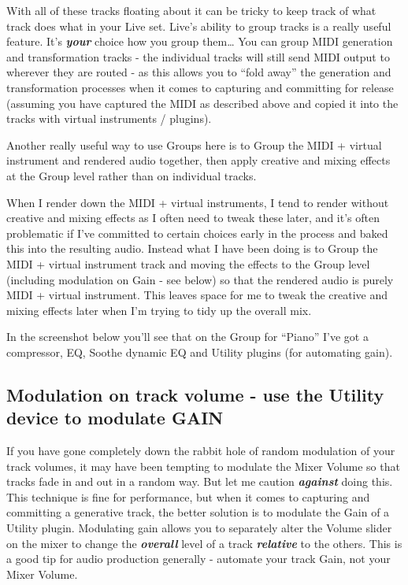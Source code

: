 \documentclass[
  12pt,
  letterpaper,
  oneside,
  open=any]{scrbook}
\makeatletter
\newcommand*\pandocbounded[1]{%
  \sbox\pandoc@box{#1}%
  \Gscale@div\@tempa{\textheight}{\dimexpr\ht\pandoc@box+\dp\pandoc@box\relax}%
  \Gscale@div\@tempb{\linewidth}{\wd\pandoc@box}%
  \ifdim\@tempb\p@<\@tempa\p@\let\@tempa\@tempb\fi%
  \ifdim\@tempa\p@<\p@\scalebox{\@tempa}{\usebox\pandoc@box}%
  \else\usebox{\pandoc@box}%
  \fi%
}
\makeatother
\begin{document}
With all of these tracks floating about it can be tricky to keep track
of what track does what in your Live set. Live's ability to group tracks
is a really useful feature. It's \textbf{\emph{your}} choice how you
group them\ldots{} You can group MIDI generation and transformation
tracks - the individual tracks will still send MIDI output to wherever
they are routed - as this allows you to ``fold away'' the generation and
transformation processes when it comes to capturing and committing for
release (assuming you have captured the MIDI as described above and
copied it into the tracks with virtual instruments / plugins).

Another really useful way to use Groups here is to Group the MIDI +
virtual instrument and rendered audio together, then apply creative and
mixing effects at the Group level rather than on individual tracks.

When I render down the MIDI + virtual instruments, I tend to render
without creative and mixing effects as I often need to tweak these
later, and it's often problematic if I've committed to certain choices
early in the process and baked this into the resulting audio. Instead
what I have been doing is to Group the MIDI + virtual instrument track
and moving the effects to the Group level (including modulation on Gain
- see below) so that the rendered audio is purely MIDI + virtual
instrument. This leaves space for me to tweak the creative and mixing
effects later when I'm trying to tidy up the overall mix.

In the screenshot below you'll see that on the Group for ``Piano'' I've
got a compressor, EQ, Soothe dynamic EQ and Utility plugins (for
automating gain).

\pandocbounded{\texttt{[image: images/Workflow2\_Group.png]}}

\subsection{Modulation on track volume - use the Utility device to
modulate
GAIN}\label{modulation-on-track-volume---use-the-utility-device-to-modulate-gain}

If you have gone completely down the rabbit hole of random modulation of
your track volumes, it may have been tempting to modulate the Mixer
Volume so that tracks fade in and out in a random way. But let me
caution \textbf{\emph{against}} doing this. This technique is fine for
performance, but when it comes to capturing and committing a generative
track, the better solution is to modulate the Gain of a Utility plugin.
Modulating gain allows you to separately alter the Volume slider on the
mixer to change the \textbf{\emph{overall}} level of a track
\textbf{\emph{relative}} to the others. This is a good tip for audio
production generally - automate your track Gain, not your Mixer Volume.
\end{document}
